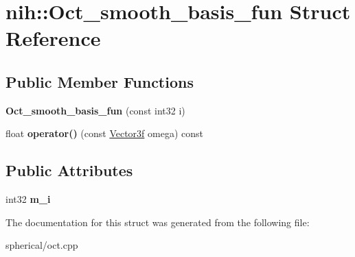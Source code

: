 \hypertarget{structnih_1_1_oct__smooth__basis__fun}{
\section{nih\-:\-:\-Oct\-\_\-smooth\-\_\-basis\-\_\-fun \-Struct \-Reference}
\label{structnih_1_1_oct__smooth__basis__fun}
}
\subsection*{\-Public \-Member \-Functions}
\begin{DoxyCompactItemize}
\item 
\hypertarget{structnih_1_1_oct__smooth__basis__fun_a11f44dfa684e14d5e4fd7ff0152022ef}{
{\bfseries \-Oct\-\_\-smooth\-\_\-basis\-\_\-fun} (const int32 i)}
\label{structnih_1_1_oct__smooth__basis__fun_a11f44dfa684e14d5e4fd7ff0152022ef}

\item 
\hypertarget{structnih_1_1_oct__smooth__basis__fun_a05895827256b12838ef2fd421ff1f6ef}{
float {\bfseries operator()} (const \hyperlink{structnih_1_1_vector}{\-Vector3f} omega) const }
\label{structnih_1_1_oct__smooth__basis__fun_a05895827256b12838ef2fd421ff1f6ef}

\end{DoxyCompactItemize}
\subsection*{\-Public \-Attributes}
\begin{DoxyCompactItemize}
\item 
\hypertarget{structnih_1_1_oct__smooth__basis__fun_abb813fbd50f1d1a506906177f313dd71}{
int32 {\bfseries m\-\_\-i}}
\label{structnih_1_1_oct__smooth__basis__fun_abb813fbd50f1d1a506906177f313dd71}

\end{DoxyCompactItemize}


\-The documentation for this struct was generated from the following file\-:\begin{DoxyCompactItemize}
\item 
spherical/oct.\-cpp\end{DoxyCompactItemize}
